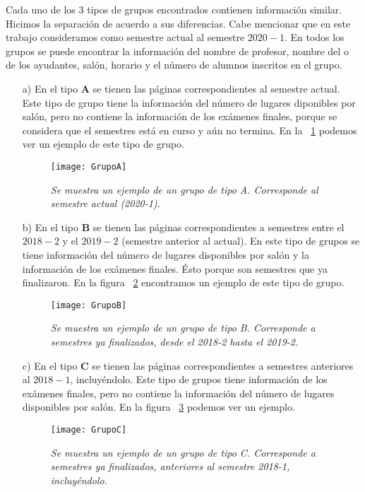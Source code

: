   Cada uno de los 3 tipos de grupos encontrados contienen información similar. Hicimos la separación de acuerdo a sus diferencias. Cabe mencionar que en este trabajo consideramos como semestre actual al semestre $2020-1$. En todos los grupos se puede encontrar la información del nombre de profesor, nombre del o de los ayudantes, salón, horario y el número de alumnos inscritos en el grupo.
  
  \begin{enumerate}
  \item[a)] En el tipo \textbf{A} se tienen las páginas correspondientes al semestre actual. Este tipo de grupo tiene la información del número de lugares diponibles por salón, pero no contiene la información de los exámenes finales, porque se considera que el semestres está en curso y aún no termina. En la \figurename{~\ref{GpoA}} podemos ver un ejemplo de este tipo de grupo.
  
  \begin{figure}[H]
  \centering
  \texttt{[image: GrupoA]} %
  \caption[\textit{Tipo de grupo A}]{\textit{Se muestra un ejemplo de un grupo de tipo A. Corresponde al semestre actual (2020-1).}}\label{GpoA}
  \end{figure}
  
  \item[b)] En el tipo \textbf{B} se tienen las páginas correspondientes a semestres entre el $2018-2$ y el $2019-2$ (semestre anterior al actual). En este tipo de grupos se tiene información del número de lugares disponibles por salón y la información de los exámenes finales. Ésto porque son semestres que ya finalizaron. En la figura \figurename{~\ref{GpoB}} encontramos un ejemplo de este tipo de grupo.
  
  \begin{figure}[H]
  \centering
  \texttt{[image: GrupoB]} %
  \caption[\textit{Tipo de grupo B}]{\textit{Se muestra un ejemplo de un grupo de tipo B. Corresponde a semestres ya finalizados, desde el 2018-2 hasta el 2019-2.}}\label{GpoB}
  \end{figure}
  
  \item[c)] En el tipo \textbf{C} se tienen las páginas correspondientes a semestres anteriores al $2018-1$, incluyéndolo. Este tipo de grupos tiene información de los exámenes finales, pero no contiene la información del número de lugares disponibles por salón. En la figura \figurename{~\ref{GpoC}} podemos ver un ejemplo.
  
  \begin{figure}[H]
  \centering
  \texttt{[image: GrupoC]} %
  \caption[\textit{Tipo de grupo C}]{\textit{Se muestra un ejemplo de un grupo de tipo C. Corresponde a semestres ya finalizados, anteriores al semestre 2018-1, incluyéndolo.}}\label{GpoC}
  \end{figure}
  \end{enumerate}
  
